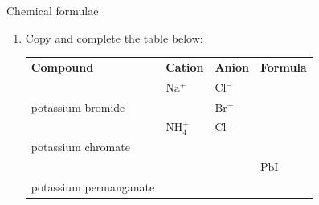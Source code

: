             \begin{exercises}{  Chemical formulae
        }
            \nopagebreak
        \label{m38689*id145052}\begin{enumerate}[noitemsep, label=\textbf{\arabic*}. ] 
            \label{m38689*uid100}\item 
Copy and complete the table below:
          \begin{table}[H]
        \begin{center}
      \label{m38689*id145067}
    \noindent
      \tablelasttail{}
      \begin{xtabular}[t]{|l|l|l|l|}\hline
        \textbf{Compound} &
        \textbf{Cation} &
        \textbf{Anion} &
        \textbf{Formula}%
     \tabularnewline{}
         &
        $\mathrm{Na}{}^{+}$ &
        $\mathrm{Cl}{}^{-}$ &
     \tabularnewline{}
        potassium bromide &
         &
        $\mathrm{Br}{}^{-}$ &
     \tabularnewline{}
         &
        $\mathrm{NH}_{4}^{+}$ &
        $\mathrm{Cl}{}^{-}$ &
     \tabularnewline{}
        potassium chromate &
         &
         &
     \tabularnewline{}
         &
         &
         &
        $\mathrm{PbI}$%
     \tabularnewline{}
        potassium permanganate &
         &
         &

\end{xtabular}
\end{center}
\end{table}
\end{enumerate}
\end{exercises}
